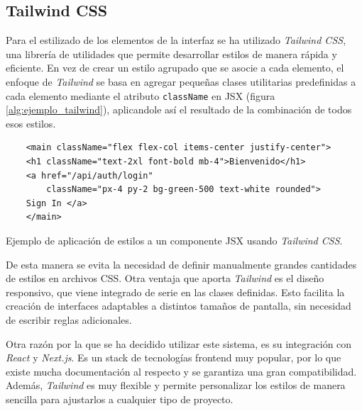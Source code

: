 \subsection{Tailwind CSS}

Para el estilizado de los elementos de la interfaz se ha utilizado \textit{Tailwind CSS}, una librería de utilidades que permite desarrollar estilos de manera rápida y eficiente. En vez de crear un estilo agrupado que se asocie a cada elemento, el enfoque de \textit{Tailwind} se basa en agregar pequeñas clases utilitarias predefinidas a cada elemento mediante el atributo \texttt{className} en JSX (figura \ref{alg:ejemplo_tailwind}), aplicandole así el resultado de la combinación de todos esos estilos.

\setlength{\intextsep}{15pt} %
\setlength{\abovecaptionskip}{0pt} %
\setlength{\belowcaptionskip}{0pt} %

\begin{ifalgorithm}[H]
    \begin{lstlisting}
    <main className="flex flex-col items-center justify-center">
    <h1 className="text-2xl font-bold mb-4">Bienvenido</h1>
    <a href="/api/auth/login"
        className="px-4 py-2 bg-green-500 text-white rounded">
    Sign In </a>
    </main>
    \end{lstlisting}
    \caption{Ejemplo de aplicación de estilos a un componente JSX usando \textit{Tailwind CSS}.}
    \label{alg:ejemplo_tailwind}
\end{ifalgorithm}

De esta manera se evita la necesidad de definir manualmente grandes cantidades de estilos en archivos CSS. Otra ventaja que aporta \textit{Tailwind} es el diseño responsivo, que viene integrado de serie en las clases definidas. Esto facilita la creación de interfaces adaptables a distintos tamaños de pantalla, sin necesidad de escribir reglas adicionales.

Otra razón por la que se ha decidido utilizar este sistema, es su integración con \textit{React} y \textit{Next.js}. Es un stack de tecnologías frontend muy popular, por lo que existe mucha documentación al respecto y se garantiza una gran compatibilidad. Además, \textit{Tailwind} es muy flexible y permite personalizar los estilos de manera sencilla para ajustarlos a cualquier tipo de proyecto.

